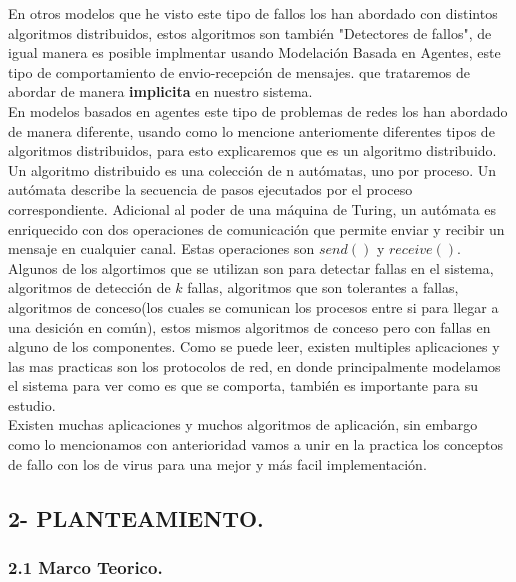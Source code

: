 \documentclass[12pt]{article}
\begin{document}
En otros modelos que he visto este tipo de fallos los han abordado con distintos algoritmos distribuidos, estos algoritmos son también "Detectores de fallos", de igual manera es posible implmentar usando Modelación Basada en Agentes, este tipo de comportamiento de envio-recepción de mensajes. que trataremos de abordar de manera \textbf{implicita} en nuestro sistema.\\

En modelos basados en agentes este tipo de problemas de redes los han abordado de manera diferente, usando como lo mencione anteriomente diferentes tipos de algoritmos distribuidos, para esto explicaremos que es un algoritmo distribuido.
Un algoritmo distribuido es una colección de n autómatas, uno por proceso. Un autómata describe la secuencia de pasos ejecutados por el proceso correspondiente. Adicional al poder de una máquina de Turing, un autómata es enriquecido con dos operaciones de comunicación que permite enviar y recibir un mensaje en cualquier canal. Estas
operaciones son $send()$ y $receive()$.\\

Algunos de los algortimos que se utilizan son para detectar fallas en el sistema, algoritmos de detección de $k$ fallas, algoritmos que son tolerantes a fallas, algoritmos de conceso(los cuales se comunican los procesos entre si para llegar a una desición en común), estos mismos algoritmos de conceso pero con fallas en alguno de los componentes.
Como se puede leer, existen multiples aplicaciones y las mas practicas son los protocolos de red, en donde principalmente modelamos el sistema para ver como es que se comporta, también es importante para su estudio.\\

Existen muchas aplicaciones y muchos algoritmos de aplicación, sin embargo como lo mencionamos con anterioridad vamos a unir en la practica los conceptos de fallo con los de virus para una mejor y más facil implementación.\\

{\color{blue} \subsection*{2- PLANTEAMIENTO.}}
\vspace{1em}

{\color{red} \subsubsection*{2.1 Marco Teorico.}}
\vspace{1em}
\end{document}
